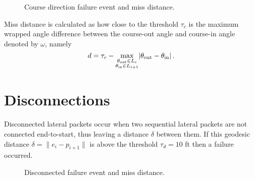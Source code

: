 \begin{figure}[!ht]
\centering
\resizebox{0.6\columnwidth}{!}{}
\caption{Course direction failure event and miss distance.}
\label{fig:course_direction}
\end{figure}

Miss distance is calculated as how close to the threshold $\tau_c$ is the maximum wrapped angle difference between the course-out angle and course-in angle denoted by $\omega$, namely
\begin{equation*}
  d = \tau_c - \max\limits_{\substack{\theta_\text{out} \in L_i\\\theta_\text{in} \in L_{i+1}}}\abs{\theta_\text{out} - \theta_\text{in}}.
\end{equation*}



\section{Disconnections}
Disconnected lateral packets occur when two sequential lateral packets are not connected end-to-start, thus leaving a distance $\delta$ between them. If this geodesic distance $\delta = \lVert e_i - p_{i+1} \rVert$ is above the threshold $\tau_d = 10$ \si{ft} then a failure occurred.

\begin{figure}[!ht]
\centering
\resizebox{0.6\columnwidth}{!}{}
\caption{Disconnected failure event and miss distance.}
\label{fig:disconnection}
\end{figure}


